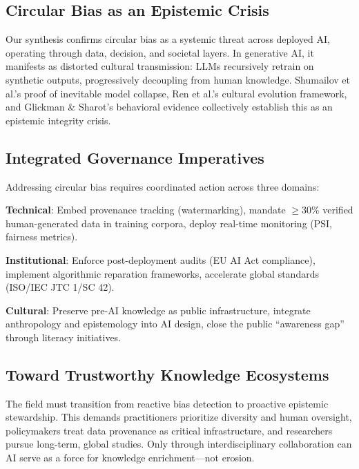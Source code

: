 \documentclass[11pt]{article}
\begin{document}
\subsection{Circular Bias as an Epistemic Crisis}

Our synthesis confirms circular bias as a systemic threat across deployed AI, operating through data, decision, and societal layers. In generative AI, it manifests as distorted cultural transmission: LLMs recursively retrain on synthetic outputs, progressively decoupling from human knowledge. Shumailov et al.'s\cite{shumailov2024} proof of inevitable model collapse, Ren et al.'s\cite{ren2024} cultural evolution framework, and Glickman \& Sharot's\cite{glickman2024} behavioral evidence collectively establish this as an epistemic integrity crisis.

\subsection{Integrated Governance Imperatives}

Addressing circular bias requires coordinated action across three domains:

\textbf{Technical}: Embed provenance tracking (watermarking\cite{shumailov2024}), mandate $\geq$30\% verified human-generated data in training corpora\cite{ren2024}, deploy real-time monitoring (PSI, fairness metrics).

\textbf{Institutional}: Enforce post-deployment audits (EU AI Act compliance\cite{european2021}), implement algorithmic reparation frameworks\cite{wyllie2024}, accelerate global standards (ISO/IEC JTC 1/SC 42\cite{iso2023}).

\textbf{Cultural}: Preserve pre-AI knowledge as public infrastructure, integrate anthropology and epistemology into AI design, close the public ``awareness gap''\cite{glickman2024} through literacy initiatives.

\subsection{Toward Trustworthy Knowledge Ecosystems}

The field must transition from reactive bias detection to proactive epistemic stewardship. This demands practitioners prioritize diversity and human oversight, policymakers treat data provenance as critical infrastructure, and researchers pursue long-term, global studies. Only through interdisciplinary collaboration can AI serve as a force for knowledge enrichment—not erosion.
\end{document}
